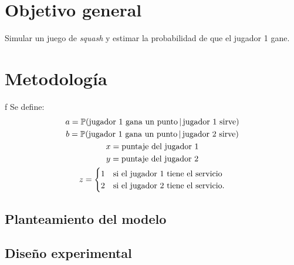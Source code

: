\documentclass[11pt,letterpaper]{scrartcl}
\begin{document}
	\section{Objetivo general}
	Simular un juego de \textit{squash} y estimar la probabilidad de que el jugador 1 gane.
	\section{Metodología}
	f
	Se define:
	\begin{gather}
		a = \mathbb{P}(\text{jugador 1 gana un punto}\,|\,\text{jugador 1 sirve})\\
		b = \mathbb{P}(\text{jugador 1 gana un punto}\,|\,\text{jugador 2 sirve})\\
		x = \text{puntaje del jugador 1}\\
		y = \text{puntaje del jugador 2}\\
		z = \begin{cases}
			1 & \text{si el jugador 1 tiene el servicio}\\
			2 & \text{si el jugador 2 tiene el servicio\text{.}}
		\end{cases} 
	\end{gather}
		\subsection{Planteamiento del modelo}
		\subsection{Diseño experimental}
	
	
	
	
\end{document}
